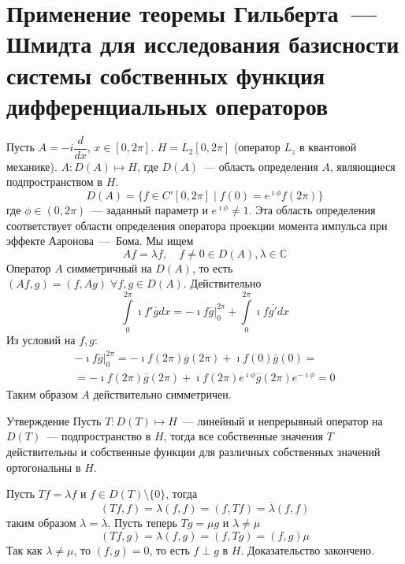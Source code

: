 \documentclass[14pt]{extarticle}
\begin{document}
\section*{Применение теоремы Гильберта~--- Шмидта для исследования базисности
системы собственных функция дифференциальных операторов}
\begin{Prim}
    Пусть $A = -i\dfrac{d}{dx}$, $x \in [0, 2\pi]$.
    $H = L_2[0, 2\pi]$ (оператор $L_z$ в квантовой механике).
    $A : D(A) \mapsto H$, где $D(A)$~--- область определения $A$, являющиеся
    подпространством в $H$.
    $$
    D(A) = \{f \in C'[0,2\pi] \mid f(0) = e^{\imath \phi}f(2\pi)\}
    $$
    где $\phi \in (0, 2\pi)$~--- заданный параметр и $e^{\imath \phi} \neq 1$.
    Эта область определения соответствует области определения оператора проекции
    момента импульса при эффекте Ааронова~---~Бома.
    Мы ищем
    $$
    Af = \lambda f,\quad f \neq 0\in D(A), \lambda \in \mathbb C
    $$
    Оператор $A$ симметричный на $D(A)$, то есть $(Af, g) = (f, Ag)\;\forall f,g \in D(A)$.
    Действительно
    $$
    \int\limits_{0}^{2\pi}\imath f' \overline{g} dx = \left. -\imath f \overline{g}\right|_{0}^{2\pi} +
    \int\limits_{0}^{2\pi}\imath f \overline{g'}dx
    $$
    Из условий на $f, g$:
    \begin{multline*}
        \left. -\imath f \overline{g}\right|_{0}^{2\pi} = -\imath f(2\pi)\overline{g}(2\pi) + 
        \imath f(0)\overline{g}(0) =\\=  -\imath f(2\pi)\overline{g}(2\pi) + 
        \imath f(2\pi)e^{\imath \phi}\overline{g}(2\pi)e^{-\imath \phi} = 0
    \end{multline*}
    Таким образом $A$ действительно симметричен.
    \begin{MathCl}{Утверждение}
        Пусть $T : D(T) \mapsto H$~--- линейный и непрерывный оператор на $D(T)$~---
        подпространство в $H$, тогда все собственные значения $T$ действительны и
        собственные функции для различных собственных значений ортогональны в $H$.
    \end{MathCl}
    \begin{Proof}
        Пусть $Tf = \lambda f$ и $f \in D(T) \setminus \{0\}$, тогда
        $$
        (Tf, f) = \lambda(f, f) = (f, Tf) = \overline{\lambda} (f, f)
        $$
        таким образом $\lambda = \overline{\lambda}$.
        Пусть теперь $Tg = \mu g$ и $\lambda \neq \mu$
        $$
        (Tf, g) = \lambda(f, g) = (f, Tg) = (f, g) \mu
        $$
        Так как $\lambda \neq \mu$, то $(f, g) = 0$, то есть $f \perp g$ в $H$.
        Доказательство закончено.
    \end{Proof}


\end{Prim}
\end{document}
